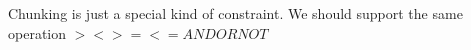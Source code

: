 Chunking is just a special kind of constraint. We should support the same operation $> < >= <= AND OR NOT$